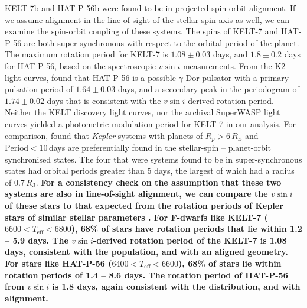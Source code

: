 \documentclass[useAMS,usenatbib]{mn2e}
\begin{document}
KELT-7b and HAT-P-56b were found to be in projected spin-orbit alignment. If we assume alignment in the line-of-sight of the stellar spin axis as well, we can examine the spin-orbit coupling of these systems. The spins of KELT-7 and HAT-P-56 are both super-synchronous with respect to the orbital period of the planet. The maximum rotation period for KELT-7 is $1.08\pm0.03$ days, and $1.8\pm0.2$ days for HAT-P-56, based on the spectroscopic $v \sin i$ measurements. From the K2 light curves, \citet{2015AJ....150...85H} found that HAT-P-56 is a possible $\gamma$ Dor-pulsator with a primary pulsation period of $1.64\pm0.03$ days, and a secondary peak in the periodogram of $1.74\pm0.02$ days that is consistent with the $v\sin i$ derived rotation period. Neither the KELT discovery light curves, nor the archival SuperWASP light curves \citep{2010A&amp;A...520L..10B} yielded a photometric modulation period for KELT-7 in our analysis.  For comparison, \citet{2013MNRAS.436.1883W} found that \emph{Kepler} systems with planets of $R_p > 6 \,R_\text{E}$ and $\text{Period}<10$\,days are preferentially found in the stellar-spin -- planet-orbit synchronised states. The four that were systems found to be in super-synchronous states had orbital periods greater than 5 days, the largest of which had a radius of $0.7\,R_\mathrm{J}$. \textbf{For a consistency check on the assumption that these two systems are also in line-of-sight alignment, we can compare the $v\sin i$ of these stars to that expected from the rotation periods of Kepler stars of similar stellar parameters \citep{2013A&amp;A...557L..10N}. For F-dwarfs like KELT-7 ($6600 < T_\mathrm{eff} < 6800$), 68\% of stars have rotation periods that lie within 1.2 -- 5.9 days. The $v\sin i$-derived rotation period of the KELT-7 is 1.08 days, consistent with the population, and with an aligned geometry. For stars like HAT-P-56 ($6400 < T_\mathrm{eff} < 6600$), 68\% of stars lie within rotation periods of 1.4 -- 8.6 days. The rotation period of HAT-P-56 from $v\sin i$ is 1.8 days, again consistent with the distribution, and with alignment.}
\end{document}

